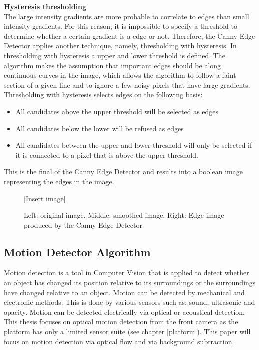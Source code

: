 \documentclass[a4paper]{article}
\begin{document}
\noindent\textbf{Hysteresis thresholding}\\
The large intensity gradients are more probable to correlate to edges than small intensity gradients. For this reason, it is impossible to specify a threshold to determine whether a certain gradient is a edge or not. Therefore, the Canny Edge Detector applies another technique, namely, thresholding with hysteresis. In thresholding with hysteresis a upper and lower threshold is defined. The algorithm makes the assumption that important edges should be along continuous curves in the image, which allows the algorithm to follow a faint section of a given line and to ignore a few noisy pixels that have large gradients. Thresholding with hysteresis selects edges on the following basis:
\begin{itemize}
\item All candidates above the upper threshold will be selected as edges
\item All candidates below the lower will be refused as edges
\item All candidates between the upper and lower threshold will only be selected if it is connected to a pixel that is above the upper threshold.
\end{itemize}
This is the final of the Canny Edge Detector and results into a boolean image representing the edges in the image.

\begin{figure}

[Insert image]

\caption{Left: original image. Middle: smoothed image. Right: Edge image produced by the Canny Edge Detector}
\label{canny}
\end{figure}


\subsection{Motion Detector Algorithm}
Motion detection is a tool in Computer Vision that is applied to detect whether an object has changed its position relative to its surroundings or the surroundings have changed relative to an object. Motion can be detected by mechanical and electronic methods. This is done by various sensors such as: sound, ultrasonic and opacity. Motion can be detected electrically via optical or acoustical detection. This thesis focuses on optical motion detection from the front camera as the platform has only a limited sensor suite (see chapter \ref{platform}). This paper will focus on motion detection via optical flow and via background subtraction.
\end{document}
